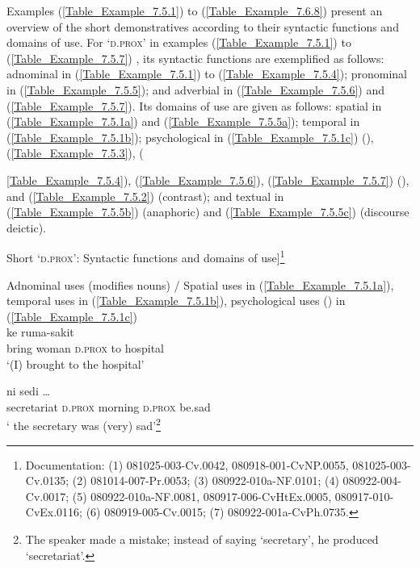 Examples (\ref{Table_Example_7.5.1}) to (\ref{Table_Example_7.6.8})  present an overview of the short demonstratives according to their syntactic functions and domains of use. For  ‘\textsc{d.prox}’ in examples (\ref{Table_Example_7.5.1}) to (\ref{Table_Example_7.5.7}) , its syntactic functions are exemplified as follows: adnominal in (\ref{Table_Example_7.5.1}) to (\ref{Table_Example_7.5.4}); pronominal in (\ref{Table_Example_7.5.5}); and adverbial in (\ref{Table_Example_7.5.6}) and (\ref{Table_Example_7.5.7}). Its domains of use are given as follows: spatial in (\ref{Table_Example_7.5.1a}) and (\ref{Table_Example_7.5.5a}); temporal in (\ref{Table_Example_7.5.1b}); psychological in (\ref{Table_Example_7.5.1c}) (), (\ref{Table_Example_7.5.3}), ({\ref{Table_Example_7.5.4}), (\ref{Table_Example_7.5.6}), (\ref{Table_Example_7.5.7}) (), and (\ref{Table_Example_7.5.2}) (contrast); and textual in (\ref{Table_Example_7.5.5b}) (anaphoric) and (\ref{Table_Example_7.5.5c}) (discourse deictic).\\

\newpage


\begin{styleExampleTitle}
Short  ‘\textsc{d.prox}’: Syntactic functions and domains of use]\footnote{Documentation: (1) 081025-003-Cv.0042, 080918-001-CvNP.0055, 081025-003-Cv.0135; (2) 081014-007-Pr.0053; (3) 080922-010a-NF.0101; (4) 080922-004-Cv.0017; (5) 080922-010a-NF.0081, 080917-006-CvHtEx.0005, 080917-010-CvEx.0116; (6) 080919-005-Cv.0015; (7) 080922-001a-CvPh.0735.}\\

\end{styleExampleTitle}
\ea
\label{Table_Example_7.5.1}
Adnominal uses (modifies nouns) / Spatial uses in (\ref{Table_Example_7.5.1a}), temporal uses in (\ref{Table_Example_7.5.1b}), psychological uses () in (\ref{Table_Example_7.5.1c})\\
\ea
\label{Table_Example_7.5.1a} 
   {ke} {ruma-sakit}\\
 {bring} {woman} {\textsc{d.prox}} {to} {hospital }\\
\glt ‘(I) brought   to the hospital’ \\
\vspace{5pt}

\ex\label{Table_Example_7.5.1b}
 {ni}   {sedi} {\ldots}  \\
{secretariat} \textsc{d.prox} {morning} \textsc{d.prox} {be.sad}   \\
\glt ‘ the secretary was (very) sad’\footnote{The speaker made a mistake; instead of saying  ‘secretary’, he produced  ‘secretariat’.}\\
\vspace{5pt}

}
